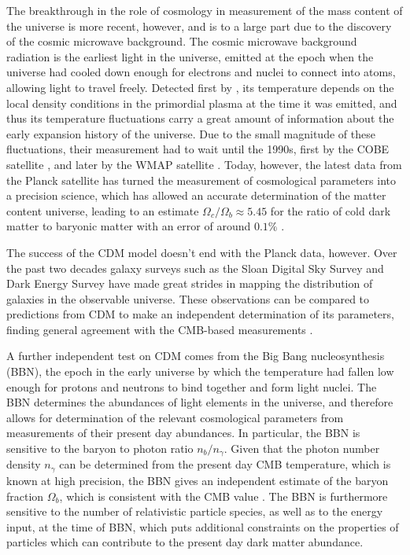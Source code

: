 \documentclass[b5paper, 10pt, twoside]{book}
\begin{document}
The breakthrough in the role of cosmology in measurement of the mass content of the universe is more recent, however, and is to a large part due to the discovery of the cosmic microwave background. The cosmic microwave background radiation is the earliest light in the universe, emitted at the epoch when the universe had cooled down enough for electrons and nuclei to connect into atoms, allowing light to travel freely. Detected first by \textcite{PenziasWilson1965}, its temperature depends on the local density conditions in the primordial plasma at the time it was emitted, and thus its temperature fluctuations carry a great amount of information about the early expansion history of the universe. Due to the small magnitude of these fluctuations, their measurement had to wait until the 1990s, first by the COBE satellite \parencite{BennettEtAl1996}, and later by the WMAP satellite \parencite{BennettEtAl2013}. Today, however, the latest data from the Planck satellite has turned the measurement of cosmological parameters into a precision science, which has allowed an accurate determination of the matter content universe, leading to an estimate $\Omega_c/\Omega_b\approx 5.45$ for the ratio of cold dark matter to baryonic matter with an error of around $0.1\%$ \parencite{Planck2018}.

The success of the \textLambda{}CDM model doesn't end with the Planck data, however. Over the past two decades galaxy surveys such as the Sloan Digital Sky Survey \parencite{SDSSIV2022} and Dark Energy Survey \parencite{DES2018} have made great strides in mapping the distribution of galaxies in the observable universe. These observations can be compared to predictions from \textLambda{}CDM to make an independent determination of its parameters, finding general agreement with the CMB-based measurements \parencite{eBOSS2021}.

A further independent test on \textLambda{}CDM comes from the Big Bang nucleosynthesis (BBN), the epoch in the early universe by which the temperature had fallen low enough for protons and neutrons to bind together and form light nuclei. The BBN determines the abundances of light elements in the universe, and therefore allows for determination of the relevant cosmological parameters from measurements of their present day abundances. In particular, the BBN is sensitive to the baryon to photon ratio $n_b/n_\gamma$. Given that the photon number density $n_\gamma$ can be determined from the present day CMB temperature, which is known at high precision, the BBN gives an independent estimate of the baryon fraction $\Omega_b$, which is consistent with the CMB value \parencite{FieldsEtAl2020}. The BBN is furthermore sensitive to the number of relativistic particle species, as well as to the energy input, at the time of BBN, which puts additional constraints on the properties of particles which can contribute to the present day dark matter abundance.
\end{document}
